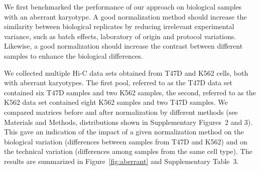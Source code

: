 \documentclass[a4,center,fleqn]{NAR}
\providecommand{\DIFadd}[1]{{\protect\color{red}#1}} %
\providecommand{\DIFdel}[1]{{\protect}}                      %
\providecommand{\DIFaddbegin}{} %
\providecommand{\DIFaddend}{} %
\providecommand{\DIFdelbegin}{} %
\providecommand{\DIFdelend}{} %
\begin{document}
We first benchmarked the performance of our approach on biological
samples with an aberrant karyotype. A good normalization method should
increase the similarity between biological replicates by reducing
irrelevant experimental variance, such as batch effects, laboratory of
origin and protocol variations. \DIFdelbegin \DIFdel{Similarly}\DIFdelend \DIFaddbegin \DIFadd{Likewise}\DIFaddend , a good normalization should
\DIFdelbegin \DIFdel{decrease the similarity }\DIFdelend \DIFaddbegin \DIFadd{increase the contrast }\DIFaddend between different samples to enhance the
biological differences.

We \DIFdelbegin \DIFdel{assembled two }\DIFdelend \DIFaddbegin \DIFadd{collected multiple }\DIFaddend Hi-C data sets obtained from T47D and K562 cells\DIFdelbegin \DIFdel{.  In
each set we spiked two }\DIFdelend \DIFaddbegin \DIFadd{,
both with aberrant karyotypes. The first pool, referred to as the T47D data
set contained six T47D samples and two K562 samples, the second, referred
to as the K562 data set contained eight K562 samples and two T47D }\DIFaddend samples\DIFdelbegin \DIFdel{from the other cell line
(Table~\ref{tab:samples}) to introduce biological variability}\DIFdelend .
We compared matrices before and after normalization by different methods
\DIFdelbegin \DIFdel{using the
Pearson correlation of observed over expected counts (see \ref{sec:comp}}\DIFdelend \DIFaddbegin \DIFadd{(see Materials and Methods, distributions shown in Supplementary Figures~2
and 3}\DIFaddend ). This gave an indication of the impact of a given normalization
method \DIFaddbegin \DIFadd{on the biological variation (differences between samples from T47D
and K562) and on the technical variation (differences among samples from
the same cell type)}\DIFaddend . The results are summarized in
Figure~\ref{fig:aberrant} \DIFdelbegin \DIFdel{.
}\DIFdelend \DIFaddbegin \DIFadd{and Supplementary Table~3.
}\DIFaddend 
\end{document}
